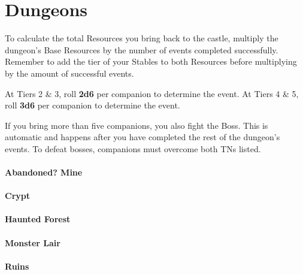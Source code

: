 \chapter{Dungeons}

To calculate the total Resources you bring back to the castle, multiply the dungeon’s Base Resources by the number of events completed successfully. Remember to add the tier of your Stables to both Resources before multiplying by the amount of successful events.

\skipline

At Tiers 2 \& 3, roll \textbf{2d6} per companion to determine the event. At Tiers 4 \& 5, roll \textbf{3d6} per companion to determine the event.

\skipline

If you bring more than five companions, you also fight the Boss. This is automatic and happens after you have completed the rest of the dungeon’s events. To defeat bosses, companions must overcome both TNs listed.

\skipline


\begin{tabbox}[4][4]
	\subsubsection{Abandoned? Mine}
	
	\subsubsection{Crypt}
	
	\subsubsection{Haunted Forest}
	
	\subsubsection{Monster Lair}
	
	\subsubsection{Ruins}

\end{tabbox}

